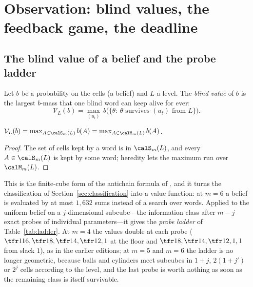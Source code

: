 \section{Observation: blind values, the feedback game, the deadline}\label{sec:observation}

\subsection{The blind value of a belief and the probe ladder}
Let $b$ be a probability on the cells (a belief) and $L$ a level. The \emph{blind value} of $b$ is the largest $b$-mass that one blind word can keep alive for ever:
\[\mathcal V_L(b)=\max_{(u_t)}\ b\big(\{\theta:\ \theta\text{ survives }(u_t)\text{ from }L\}\big).\]
\begin{proposition}\label{prop:antichain}
$\mathcal V_L(b)=\max_{A\in\calS_m(L)}b(A)=\max_{A\in\calM_m(L)}b(A)$.
\end{proposition}
\begin{proof}
The set of cells kept by a word is in $\calS_m(L)$, and every $A\in\calS_m(L)$ is kept by some word; heredity lets the maximum run over $\calM_m(L)$.
\end{proof}
This is the finite-cube form of the antichain formula of \cite{Abaee2026prob}, and it turns the classification of Section~\ref{sec:classification} into a value function: at $m=6$ a belief is evaluated by at most $1{,}632$ sums instead of a search over words. Applied to the uniform belief on a $j$-dimensional subcube---the information class after $m-j$ exact probes of individual parameters---it gives the \emph{probe ladder} of Table~\ref{tab:ladder}. At $m=4$ the values double at each probe ($\tfr1{16},\tfr18,\tfr14,\tfr12,1$ at the floor and $\tfr18,\tfr14,\tfr12,1,1$ from slack $1$), as in the earlier editions; at $m=5$ and $m=6$ the ladder is no longer geometric, because balls and cylinders meet subcubes in $1+j$, $2(1+j')$ or $2^j$ cells according to the level, and the last probe is worth nothing as soon as the remaining class is itself survivable.

